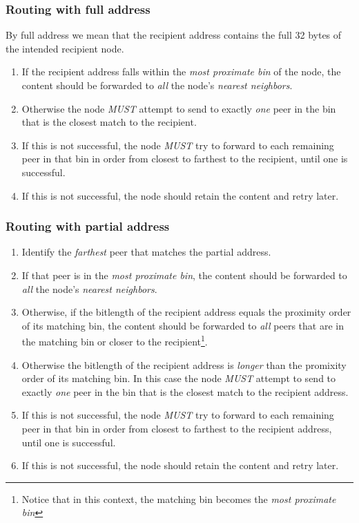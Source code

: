 




\subsubsection{Routing with full address} \label{sec:routing-with-full-address}

By full address we mean that the recipient address contains the full 32 bytes of the intended recipient node.

\begin{enumerate}
\item If the recipient address falls within the \emph{most proximate bin} of the node, the content should be forwarded to \emph{all} the node's \emph{nearest neighbors}.
\item Otherwise the node \emph{MUST} attempt to send to exactly \emph{one} peer in the bin that is the closest match to the recipient.
\item If this is not successful, the node \emph{MUST} try to forward to each remaining peer in that bin in order from closest to farthest to the recipient, until one is successful.
\item If this is not successful, the node should retain the content and retry later.
\end{enumerate}

\subsubsection{Routing with partial address}

\begin{enumerate}
\item Identify the \emph{farthest} peer that matches the partial address.
\item If that peer is in the \emph{most proximate bin}, the content should be forwarded to \emph{all} the node's \emph{nearest neighbors}.
\item Otherwise, if the bitlength of the recipient address equals the proximity order of its matching bin, the content should be forwarded to \emph{all} peers that are in the matching bin or closer to the recipient\footnote{Notice that in this context, the matching bin becomes the \emph{most proximate bin}}.
\item Otherwise the bitlength of the recipient address is \emph{longer} than the promixity order of its matching bin. In this case the node \emph{MUST} attempt to send to exactly \emph{one} peer in the bin that is the closest match to the recipient address.
\item If this is not successful, the node \emph{MUST} try to forward to each remaining peer in that bin in order from closest to farthest to the recipient address, until one is successful.
\item If this is not successful, the node should retain the content and retry later.
\end{enumerate}

